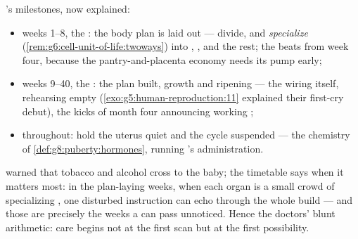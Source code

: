 \begin{proposition}\label{prop:g8:from-egg-to-birth:timetable}
's milestones,
now explained:
\begin{itemize}
  \item weeks 1--8, the \emph{}: the body plan is
        laid out ---  divide,  and
        \emph{specialize}
        (\cref{rem:g6:cell-unit-of-life:twoways}) into
        , ,  and the rest; the  beats
        from week four, because the pantry-and-placenta
        economy needs its pump early;
  \item weeks 9--40, the \emph{}: the plan built,
        growth and ripening --- the  wiring itself,
         rehearsing empty
        (\cref{exo:g5:human-reproduction:11} explained
        their first-cry debut), the kicks of month four
        announcing working ;
  \item throughout:  hold the uterus quiet and
        the cycle suspended --- the chemistry of
        \cref{def:g8:puberty:hormones}, running
        's administration.
\end{itemize}
\end{proposition}
\admitted

\begin{example}\label{ex:g8:from-egg-to-birth:earlycare}
 warned that
tobacco and alcohol cross to the baby; the timetable
says when it matters most: in the plan-laying 
weeks, when each organ is a small crowd of specializing
, one disturbed instruction can echo through the
whole build --- and those are precisely the weeks a
 can pass unnoticed. Hence the doctors' blunt
arithmetic: care begins not at the first scan but at the
first possibility.
\end{example}

